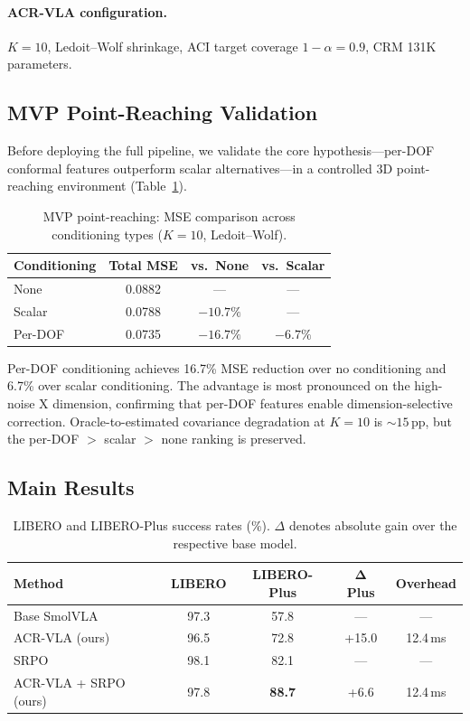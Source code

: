 \documentclass[letterpaper]{article}
\begin{document}
\paragraph{ACR-VLA configuration.} $K{=}10$, Ledoit--Wolf shrinkage, ACI target coverage $1{-}\alpha{=}0.9$, CRM 131K parameters.

\subsection{MVP Point-Reaching Validation}

Before deploying the full pipeline, we validate the core hypothesis---per-DOF conformal features outperform scalar alternatives---in a controlled 3D point-reaching environment (Table~\ref{tab:mvp}).

\begin{table}[h]
\centering
\caption{MVP point-reaching: MSE comparison across conditioning types ($K{=}10$, Ledoit--Wolf).}
\label{tab:mvp}
\begin{tabular}{lccc}
\toprule
\textbf{Conditioning} & \textbf{Total MSE} & \textbf{vs.\ None} & \textbf{vs.\ Scalar} \\
\midrule
None & 0.0882 & --- & --- \\
Scalar & 0.0788 & $-10.7\%$ & --- \\
Per-DOF & 0.0735 & $-16.7\%$ & $-6.7\%$ \\
\bottomrule
\end{tabular}
\end{table}

Per-DOF conditioning achieves 16.7\% MSE reduction over no conditioning and 6.7\% over scalar conditioning.
The advantage is most pronounced on the high-noise X dimension, confirming that per-DOF features enable dimension-selective correction.
Oracle-to-estimated covariance degradation at $K{=}10$ is ${\sim}15$\,pp, but the per-DOF $>$ scalar $>$ none ranking is preserved.

\subsection{Main Results}

\begin{table}[h]
\centering
\caption{LIBERO and LIBERO-Plus success rates (\%). $\Delta$ denotes absolute gain over the respective base model.}
\label{tab:main}
\begin{tabular}{lcccc}
\toprule
\textbf{Method} & \textbf{LIBERO} & \textbf{LIBERO-Plus} & $\boldsymbol{\Delta}$ \textbf{Plus} & \textbf{Overhead} \\
\midrule
Base SmolVLA & 97.3 & 57.8 & --- & --- \\
ACR-VLA (ours) & 96.5 & 72.8 & +15.0 & 12.4\,ms \\
\midrule
SRPO & 98.1 & 82.1 & --- & --- \\
ACR-VLA + SRPO (ours) & 97.8 & \textbf{88.7} & +6.6 & 12.4\,ms \\
\bottomrule
\end{tabular}
\end{table}
\end{document}
